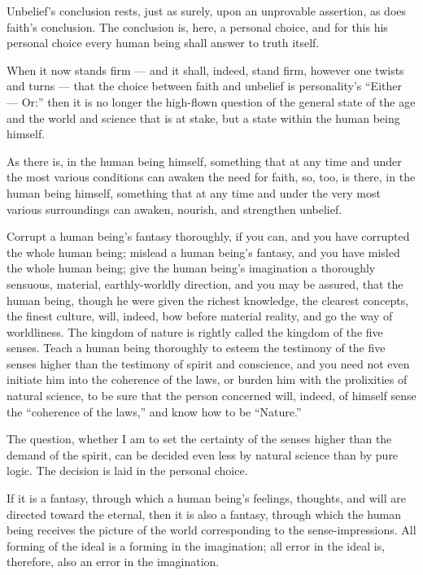 \documentclass[12pt,a4paper]{book}
\begin{document}
Unbelief's conclusion rests, just as surely, upon an unprovable assertion, as does faith's conclusion. The conclusion is, here, a personal choice, and for this his personal choice every human being shall answer to truth itself.

When it now stands firm --- and it shall, indeed, stand firm, however one twists and turns --- that the choice between faith and unbelief is personality's ``Either --- Or:'' then it is no longer the high-flown question of the general state of the age and the world and science that is at stake, but a state within the human being himself.

As there is, in the human being himself, something that at any time and under the most various conditions can awaken the need for faith, so, too, is there, in the human being himself, something that at any time and under the very most various surroundings can awaken, nourish, and strengthen unbelief.

Corrupt a human being's fantasy thoroughly, if you can, and you have corrupted the whole human being; mislead a human being's fantasy, and you have misled the whole human being; give the human being's imagination a thoroughly sensuous, material, earthly-worldly direction, and you may be assured, that the human being, though he were given the richest knowledge, the clearest concepts, the finest culture, will, indeed, bow before material reality, and go the way of worldliness.
The kingdom of nature is rightly called the kingdom of the five senses. Teach a human being thoroughly to esteem the testimony of the five senses higher than the testimony of spirit and conscience, and you need not even initiate him into the coherence of the laws, or burden him with the prolixities of natural science, to be sure that the person concerned will, indeed, of himself sense the ``coherence of the laws,'' and know how to be ``Nature.''

The question, whether I am to set the certainty of the senses higher than the demand of the spirit, can be decided even less by natural science than by pure logic. The decision is laid in the personal choice.

If it is a fantasy, through which a human being's feelings, thoughts, and will are directed toward the eternal, then it is also a fantasy, through which the human being receives the picture of the world corresponding to the sense-impressions. All forming of the ideal is a forming in the imagination; all error in the ideal is, therefore, also an error in the imagination.
\end{document}
